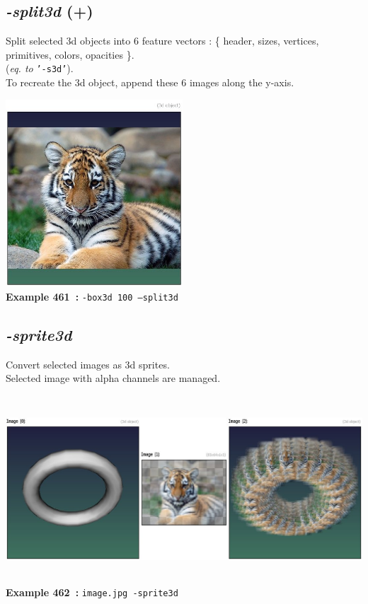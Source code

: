 \documentclass[a4paper,11pt,twoside]{book}
\begin{document}
\subsection{\emph{-split3d} (+)}\vspace*{-0.5em}
Split selected 3d objects into 6 feature vectors :
\{ header, sizes, vertices, primitives, colors, opacities \}.
~\\(\emph{eq. to} {\small \texttt{'-s3d'}}).
~\\To recreate the 3d object, append these 6 images along the y-axis.
\begin{center}\includegraphics[keepaspectratio=true,height=7cm,width=\textwidth]{img/gmic_def461.jpg}\\
{\footnotesize \textbf{Example 461~:} \texttt{-box3d 100 --split3d}}
\end{center}

\subsection{\emph{-sprite3d} }\vspace*{-0.5em}
Convert selected images as 3d sprites.
~\\Selected image with alpha channels are managed.
\begin{center}\includegraphics[keepaspectratio=true,height=7cm,width=\textwidth]{img/gmic_def462.jpg}\\
{\footnotesize \textbf{Example 462~:} \texttt{image.jpg -sprite3d}}
\end{center}
\end{document}
